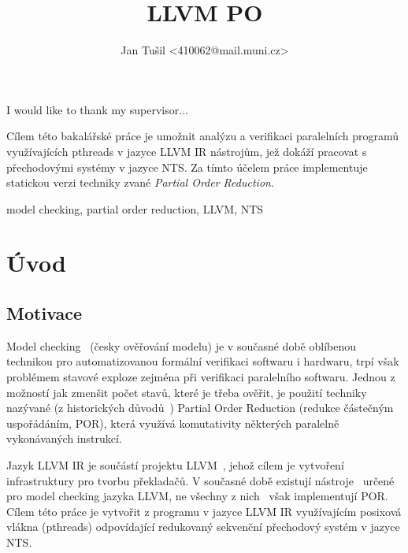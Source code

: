 \documentclass[12pt]{fithesis2}
\author{Jan Tušil <410062@mail.muni.cz>}
\title{LLVM PO}
\begin{document}
\FrontMatter
\ThesisTitlePage






\begin{ThesisDeclaration}
\DeclarationText
\AdvisorName
\end{ThesisDeclaration}

\begin{ThesisThanks}
I would like to thank my supervisor...
\end{ThesisThanks}

\begin{ThesisAbstract}
Cílem této bakalářské práce je umožnit analýzu a verifikaci paralelních programů využívajících pthreads v jazyce LLVM IR nástrojům, jež dokáží pracovat s přechodovými systémy v jazyce NTS. Za tímto účelem práce implementuje statickou verzi techniky zvané \textit{Partial Order Reduction}.
\end{ThesisAbstract}
\begin{ThesisKeyWords}
model checking, partial order reduction, LLVM, NTS
\end{ThesisKeyWords}
\MainMatter

\tableofcontents

\chapter{Úvod}
\section{Motivace}
Model checking~\cite{CLARKE} (česky ověřování modelu) je v současné době oblíbenou technikou pro automatizovanou formální verifikaci softwaru i hardwaru, trpí však problémem stavové exploze zejména při verifikaci paralelního softwaru. Jednou z možností jak zmenšit počet stavů, které je třeba ověřit, je použití techniky nazývané (z historických důvodů~\cite{CLARKE}) Partial Order Reduction (redukce částečným uspořádáním, POR), která využívá komutativity některých paralelně vykonávaných instrukcí.

Jazyk LLVM IR je součástí projektu LLVM~\cite{LLVM}, jehož cílem je vytvoření infrastruktury pro tvorbu překladačů. V současné době existují nástroje~\cite{LLBMC} určené pro model checking jazyka LLVM, ne všechny z nich~\cite{BBH+13} však implementují POR. Cílem této práce je vytvořit z programu v jazyce LLVM IR využívajícím posixová vlákna (pthreads) odpovídající redukovaný sekvenční přechodový systém v jazyce NTS.
\end{document}
